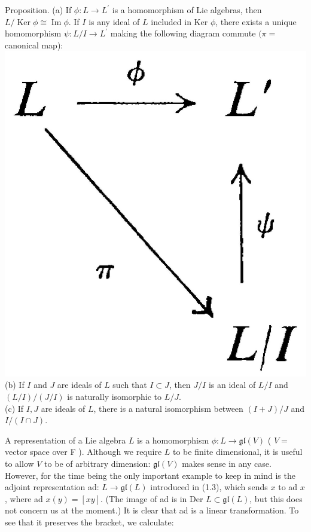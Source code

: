\documentclass[10pt]{article}
\begin{document}
Proposition. (a) If $\phi: L \rightarrow L^{\prime}$ is a homomorphism of Lie algebras, then $L / \operatorname{Ker} \phi \cong \operatorname{Im} \phi$. If $I$ is any ideal of $L$ included in Ker $\phi$, there exists a unique homomorphism $\psi: L / I \rightarrow L^{\prime}$ making the following diagram commute $(\pi=$ canonical map):\\
\includegraphics[max width=\textwidth, center]{2025_06_06_fac2836a92464059da43g-020}\\
(b) If $I$ and $J$ are ideals of $L$ such that $I \subset J$, then $J / I$ is an ideal of $L / I$ and $(L / I) /(J / I)$ is naturally isomorphic to $L / J$.\\
(c) If $I, J$ are ideals of $L$, there is a natural isomorphism between $(I+J) / J$ and $I /(I \cap J)$.

A representation of a Lie algebra $L$ is a homomorphism $\phi: L \rightarrow \mathfrak{g l}(V)$ ( $V=$ vector space over F ). Although we require $L$ to be finite dimensional, it is useful to allow $V$ to be of arbitrary dimension: $\mathfrak{g l}(V)$ makes sense in any case. However, for the time being the only important example to keep in mind is the adjoint representation ad: $L \rightarrow \mathfrak{g l}(L)$ introduced in (1.3), which sends $x$ to ad $x$, where ad $x(y)=[x y]$. (The image of ad is in Der $L \subset \mathfrak{g l}(L)$, but this does not concern us at the moment.) It is clear that ad is a linear transformation. To see that it preserves the bracket, we calculate:
\end{document}
